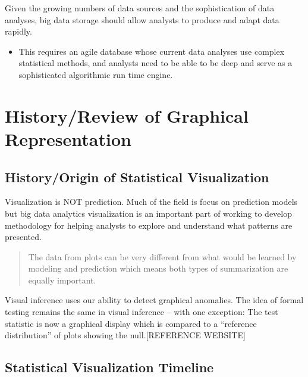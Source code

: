 \documentclass[print]{nuthesis}
\providecommand{\tightlist}{%
  \setlength{\itemsep}{0pt}\setlength{\parskip}{0pt}}
\begin{document}
Given the growing numbers of data sources and the sophistication of data analyses, big data storage should allow analysts to produce and adapt data rapidly.

\begin{itemize}
\tightlist
\item
  This requires an agile database whose current data analyses use complex statistical methods, and analysts need to be able to be deep and serve as a sophisticated algorithmic run time engine.
\end{itemize}

\hypertarget{historyreview-of-graphical-representation}{%
\section{History/Review of Graphical Representation}\label{historyreview-of-graphical-representation}}

\hypertarget{historyorigin-of-statistical-visualization}{%
\subsection{History/Origin of Statistical Visualization}\label{historyorigin-of-statistical-visualization}}

Visualization is NOT prediction. Much of the field is focus on prediction models but big data analytics visualization is an important part of working to develop methodology for helping analysts to explore and understand what patterns are presented.

\begin{quote}
The data from plots can be very different from what would be learned by modeling and prediction which means both types of summarization are equally important.
\end{quote}

Visual inference uses our ability to detect graphical anomalies. The idea of formal testing remains the same in visual inference -- with one exception: The test statistic is now a graphical display which is compared to a ``reference distribution'' of plots showing the null.{[}REFERENCE WEBSITE{]}

\hypertarget{statistical-visualization-timeline}{%
\subsection{Statistical Visualization Timeline}\label{statistical-visualization-timeline}}
\end{document}
